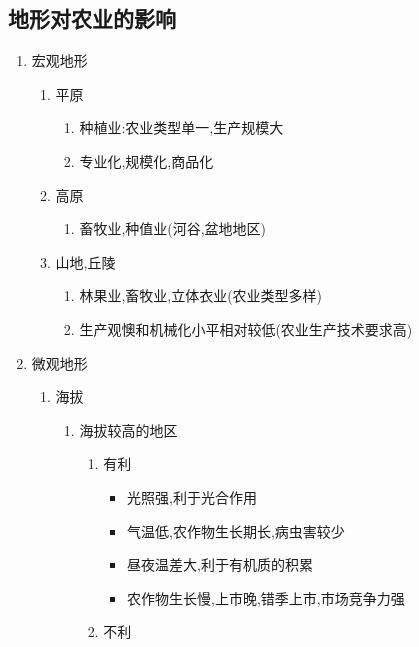 \documentclass[a4paper]{article}
\begin{document}
    \subsection{地形对农业的影响}
    \begin{enumerate}
        \item 宏观地形
        \begin{enumerate}
            \item 平原
            \begin{enumerate}
                \item 种植业:农业类型单一,生产规模大
                \item 专业化,规模化,商品化
            \end{enumerate}
            \item 高原
            \begin{enumerate}
                \item 畜牧业,种值业(河谷,盆地地区)
            \end{enumerate}
            \item 山地,丘陵
            \begin{enumerate}
                \item 林果业,畜牧业,立体衣业(农业类型多样)
                \item 生产观懊和机械化小平相对较低(农业生产技术要求高)
            \end{enumerate}
        \end{enumerate}
        \item 微观地形
        \begin{enumerate}
            \item 海拔
            \begin{enumerate}
                \item 海拔较高的地区
                \begin{enumerate}
                    \item 有利
                    \begin{itemize}
                        \item 光照强,利于光合作用
                        \item 气温低,农作物生长期长,病虫害较少
                        \item 昼夜温差大,利于有机质的积累
                        \item 农作物生长慢,上市晚,错季上市,市场竞争力强
                    \end{itemize}
                    \item 不利

\end{enumerate}
\end{enumerate}
\end{enumerate}
\end{enumerate}
\end{document}
